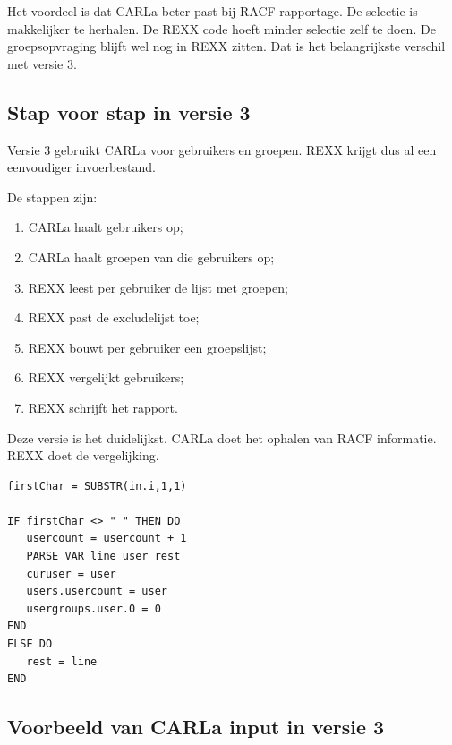 Het voordeel is dat CARLa beter past bij RACF rapportage. De selectie is makkelijker te herhalen. De REXX code hoeft minder selectie zelf te doen. De groepsopvraging blijft wel nog in REXX zitten. Dat is het belangrijkste verschil met versie 3.

\subsection*{Stap voor stap in versie 3}

Versie 3 gebruikt CARLa voor gebruikers en groepen. REXX krijgt dus al een eenvoudiger invoerbestand.

De stappen zijn:

\begin{enumerate}
	\item CARLa haalt gebruikers op;
	\item CARLa haalt groepen van die gebruikers op;
	\item REXX leest per gebruiker de lijst met groepen;
	\item REXX past de excludelijst toe;
	\item REXX bouwt per gebruiker een groepslijst;
	\item REXX vergelijkt gebruikers;
	\item REXX schrijft het rapport.
\end{enumerate}

Deze versie is het duidelijkst. CARLa doet het ophalen van RACF informatie. REXX doet de vergelijking.

\begin{listing}[htbp]
\begin{verbatim}
firstChar = SUBSTR(in.i,1,1)

IF firstChar <> " " THEN DO
   usercount = usercount + 1
   PARSE VAR line user rest
   curuser = user
   users.usercount = user
   usergroups.user.0 = 0
END
ELSE DO
   rest = line
END
\end{verbatim}
\caption[Versie 3: REXX herkent nieuwe gebruikers]{Fragment uit versie 3: REXX herkent een nieuwe gebruiker aan een regel die niet met een spatie begint. Een ingesprongen regel wordt als vervolg van dezelfde gebruiker gelezen. Bron: eigen PoC-scriptbestand \texttt{VERSIE\_3.txt}.}
\label{lst:v3-rexx-continuation}
\end{listing}

\subsection*{Voorbeeld van CARLa input in versie 3}

